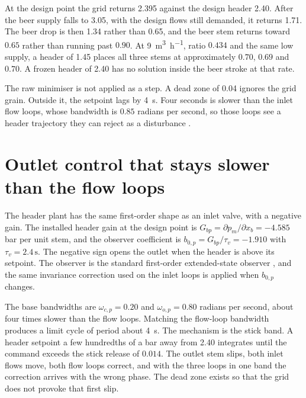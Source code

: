 \documentclass[conference,a4paper]{IEEEtran}
\begin{document}
At the design point the grid returns \SI{2.395}{\barg} against the design header \SI{2.40}{\barg}. After the beer supply falls to \SI{3.05}{\barg}, with the design flows still demanded, it returns \SI{1.71}{\barg}. The beer drop is then \SI{1.34}{\barg} rather than \SI{0.65}{\barg}, and the beer stem returns toward $0.65$ rather than running past $0.90$. At \SI{9}{\cubic\metre\per\hour}, ratio $0.434$ and the same low supply, a header of \SI{1.45}{\barg} places all three stems at approximately $0.70$, $0.69$ and $0.70$. A frozen header of \SI{2.40}{\barg} has no solution inside the beer stroke at that rate.

The raw minimiser is not applied as a step. A dead zone of \SI{0.04}{\barg} ignores the grid grain. Outside it, the setpoint lags by \SI{4}{s}. Four seconds is slower than the inlet flow loops, whose bandwidth is $0.85$ radians per second, so those loops see a header trajectory they can reject as a disturbance \cite{seborg2016process,luyben1990process}.

\section{Outlet control that stays slower than the flow loops}
The header plant has the same first-order shape as an inlet valve, with a negative gain. The installed header gain at the design point is $G_{bp}=\partial p_m/\partial x_b=-4.585$ bar per unit stem, and the observer coefficient is $b_{0,p}=G_{bp}/\tau_v=-1.910$ with $\tau_v=2.4\,\mathrm{s}$. The negative sign opens the outlet when the header is above its setpoint. The observer is the standard first-order extended-state observer \cite{han2009pid,gao2003scaling}, and the same invariance correction used on the inlet loops is applied when $b_{0,p}$ changes.

The base bandwidths are $\omega_{c,p}=0.20$ and $\omega_{o,p}=0.80$ radians per second, about four times slower than the flow loops. Matching the flow-loop bandwidth produces a limit cycle of period about \SI{4}{s}. The mechanism is the stick band. A header setpoint a few hundredths of a bar away from \SI{2.40}{\barg} integrates until the command exceeds the stick release of $0.014$. The outlet stem slips, both inlet flows move, both flow loops correct, and with the three loops in one band the correction arrives with the wrong phase. The dead zone exists so that the grid does not provoke that first slip.
\end{document}
